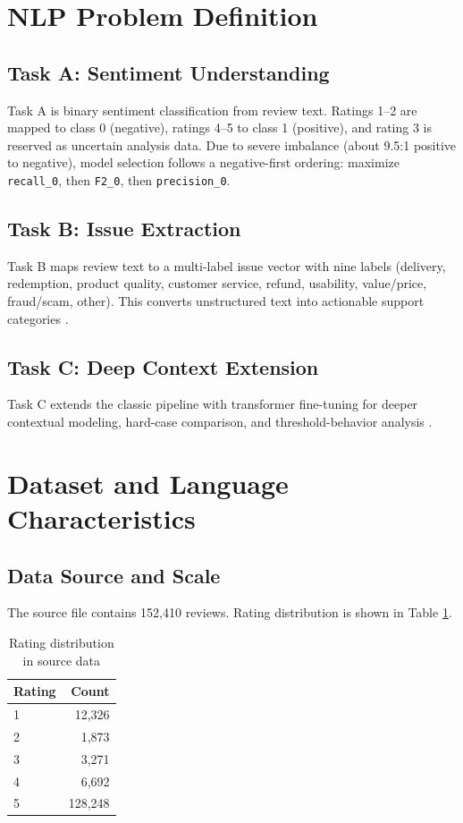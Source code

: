 \documentclass[12pt,a4paper]{article}
\begin{document}
\section{NLP Problem Definition}
\subsection{Task A: Sentiment Understanding}
Task A is binary sentiment classification from review text. Ratings 1--2 are mapped to class 0 (negative), ratings 4--5 to class 1 (positive), and rating 3 is reserved as uncertain analysis data. Due to severe imbalance (about 9.5:1 positive to negative), model selection follows a negative-first ordering: maximize \texttt{recall\_0}, then \texttt{F2\_0}, then \texttt{precision\_0}.

\subsection{Task B: Issue Extraction}
Task B maps review text to a multi-label issue vector with nine labels (delivery, redemption, product quality, customer service, refund, usability, value/price, fraud/scam, other). This converts unstructured text into actionable support categories \cite{tsoumakas2011,zhang2014}.

\subsection{Task C: Deep Context Extension}
Task C extends the classic pipeline with transformer fine-tuning for deeper contextual modeling, hard-case comparison, and threshold-behavior analysis \cite{vaswani2017,devlin2019}.

\section{Dataset and Language Characteristics}
\subsection{Data Source and Scale}
The source file contains 152,410 reviews. Rating distribution is shown in Table \ref{tab:rating_distribution}.

\begin{table}[H]
\centering
\caption{Rating distribution in source data}
\label{tab:rating_distribution}
\begin{tabular}{lr}
\toprule
Rating & Count \\
\midrule
1 & 12,326 \\
2 & 1,873 \\
3 & 3,271 \\
4 & 6,692 \\
5 & 128,248 \\
\bottomrule
\end{tabular}
\end{table}
\end{document}
